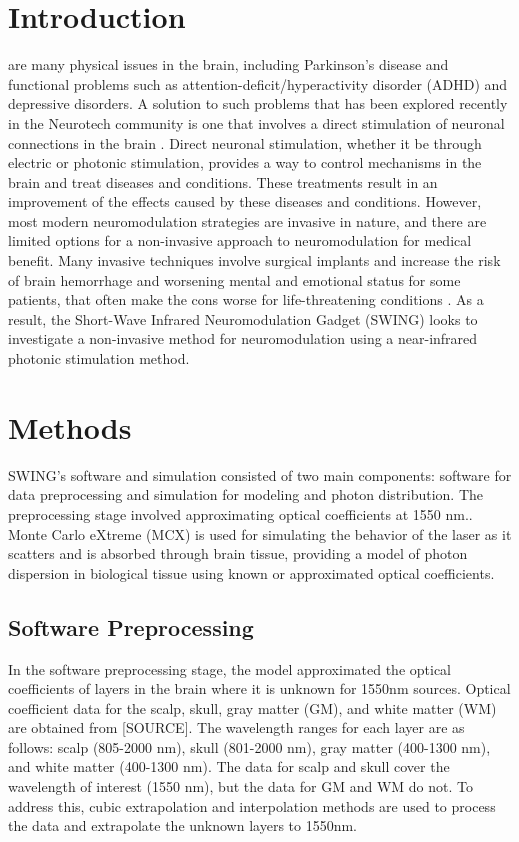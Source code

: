 \documentclass[journal,twoside,web]{ieeecolor}
\begin{document}
\section{Introduction}
\label{sec:introduction}
 are many physical issues in the brain, including Parkinson's disease and functional 
problems such as attention-deficit/hyperactivity disorder (ADHD) and depressive disorders. 
A solution to such problems that has been explored recently in the Neurotech community is one that involves a direct stimulation of  
neuronal connections in the brain \cite{b1,b2,b3}. Direct neuronal stimulation, whether it be through electric or photonic 
stimulation, provides a way to control mechanisms in the brain and treat diseases and conditions. These treatments result 
in an improvement of the effects caused by these diseases and conditions. However, most modern neuromodulation strategies 
are invasive in nature, and there are limited options for a non-invasive approach to neuromodulation for medical benefit. Many invasive 
techniques involve surgical implants and increase the risk of brain hemorrhage and worsening mental and emotional status for some patients,  
that often make the cons worse for life-threatening conditions \cite{b1,b4}. As a result, the Short-Wave Infrared Neuromodulation Gadget (SWING) 
looks to investigate a non-invasive method for neuromodulation using a near-infrared photonic stimulation method. 


\section{Methods}
\label{sec:methods}
SWING's software and simulation consisted of two main components: software for data preprocessing and simulation for modeling and photon distribution. 
The preprocessing stage involved approximating optical coefficients at 1550 nm.. Monte Carlo eXtreme (MCX) is used for simulating the 
behavior of the laser as it scatters and is absorbed through brain tissue, providing a model of photon dispersion in biological tissue using known or 
approximated optical coefficients.

\subsection{Software Preprocessing}
In the software preprocessing stage, the model approximated the optical coefficients of layers in the brain where it is unknown for 1550nm sources. Optical coefficient data for the scalp, skull, gray matter (GM), and white matter (WM) are obtained from [SOURCE]. The wavelength ranges for each layer are as follows: scalp (805-2000 nm), 
skull (801-2000 nm), gray matter (400-1300 nm), and white matter (400-1300 nm). The data for scalp and skull cover the wavelength of interest (1550 nm), but the data 
for GM and WM do not. To address this, cubic extrapolation and interpolation methods are used to process the data and extrapolate the unknown layers to 1550nm. 
\end{document}
